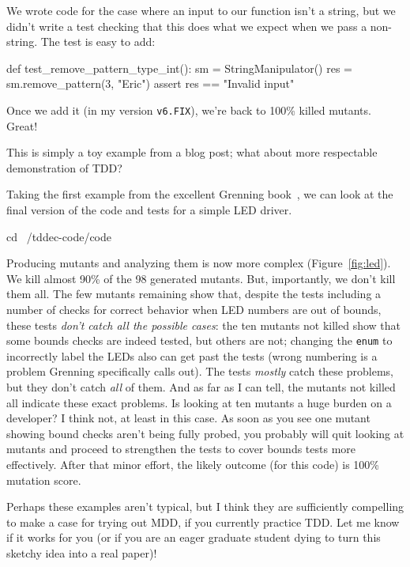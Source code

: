 \documentclass[sigplan,screen]{acmart}
\begin{document}
 We wrote code for the case where an input to our function isn't a
 string, but we didn't write a test checking that this does what we
 expect when we pass a non-string.  The test is easy to add:

 \begin{code}
def test\_remove\_pattern\_type\_int():
     sm = StringManipulator()
     res = sm.remove\_pattern(3, "Eric")
     assert res == "Invalid input"
   \end{code}

   Once we add it (in my version {\tt v6.FIX}), we're back to 100\%
   killed mutants.  Great!

   This is simply a toy example from a blog post; what about more
  respectable demonstration of TDD?

   Taking the first example from the excellent Grenning
   book~\cite{grenning}, we can look at the final version of the code
   and tests for a simple LED driver.

\begin{code}
cd ~/tddec-code/code
\end{code}

Producing mutants and analyzing them is now more complex
(Figure~\ref{fig:led}).  We kill almost 90\% of the 98 generated
mutants.  But, importantly, we don't kill them all.  The few mutants
remaining show that, despite the tests including a number of checks
for correct behavior when LED numbers are out of bounds, these tests
\emph{don't catch all the possible cases}:  the ten mutants not killed
show that some bounds checks are indeed tested, but others are not;
changing the {\tt enum} to incorrectly label the LEDs also can get
past the tests (wrong numbering is a problem Grenning specifically
calls out).  The tests \emph{mostly} catch these problems, but they
don't catch \emph{all} of them.  And as far as I can tell, the mutants
not killed all indicate these exact problems.  Is looking at ten
mutants a huge burden on a developer?  I think not, at least in this
case.  As soon as you see one mutant showing bound checks aren't being
fully probed, you probably will quit looking at mutants and proceed to
strengthen the tests to cover bounds tests more effectively.  After
that minor effort, the likely outcome (for this code) is 100\%
mutation score.

Perhaps these examples aren't typical, but I think they are
sufficiently compelling to make a case for trying out MDD, if you
currently practice TDD.  Let me know if it works for you (or if you
are an eager graduate student dying to turn this sketchy idea into a real paper)!
\end{document}
